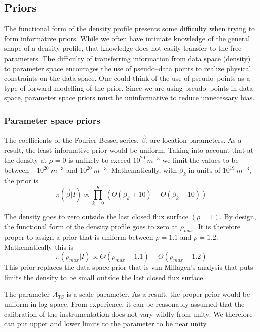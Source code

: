 \documentclass[12pt]{article}
\numberwithin{equation}{section}
\begin{document}
\subsection{Priors}
The functional form of the density profile presents some difficulty when trying to form informative priors. While we often have intimate knowledge of the general shape of a density profile, that knowledge does not easily transfer to the free parameters. The difficulty of transferring information from data space (density) to parameter space encourages the use of pseudo--data points to realize physical constraints on the data space. One could think of the use of pseudo--points as a type of forward modelling of the prior. Since we are using pseudo--points in data space, parameter space priors must be uninformative to reduce unnecessary bias. 

\subsubsection{Parameter space priors}
The coefficients of the Fourier-Bessel series, $\vec{\beta}$, are location parameters. As a result, the least informative prior would be uniform. Taking into account that at the density at $\rho = 0$ is unlikely to exceed $10^{20} \: m^{-3}$ we limit the values to be between $-10^{20} \: m^{-3}$ and $10^{20} \: m^{-3}$. Mathematically, with $\beta_k$ in units of $10^{19}\: m^{-3}$, the prior is
\begin{equation} \label{eq:coeffpriors}
	\pi(\vec{\beta}|I) \propto \prod \limits_{k=0}^{K} (\Theta(\beta_k + 10) 		- \Theta(\beta_k - 10))
\end{equation}

The density goes to zero outside the last closed flux surface $(\rho=1)$. By design, the functional form of the density profile goes to zero at $\rho_{max}$. It is therefore proper to assign a prior that is uniform between $\rho = 1.1$ and $\rho = 1.2$. Mathematically this is
\begin{equation} \label{eq:rhomaxprior}
	\pi(\rho_{max}|I) \propto \Theta(\rho_{max}-1.1)-\Theta(\rho_{max} - 1.2)
\end{equation}
This prior replaces the data space prior that is van Millagen's analysis that puts limits the density to be small outside the last closed flux surface. 

The parameter $A_{TS}$ is a scale parameter. As a result, the proper prior would be uniform in log space. From experience, it can be reasonably assumed that the calibration of the instrumentation does not vary wildly from unity. We therefore can put upper and lower limits to the parameter to be near unity. 
\end{document}
